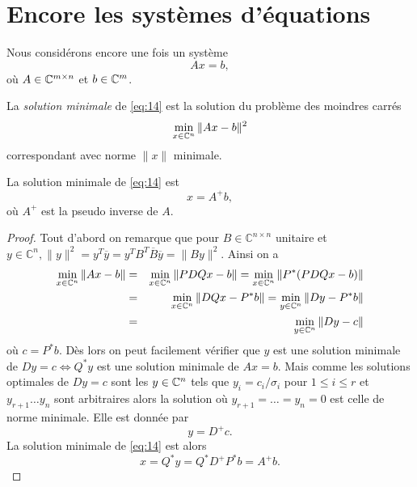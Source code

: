 \section{Encore les systèmes d'équations }
\label{sec:encore-les-systemes}
Nous considérons encore une fois un système 
\begin{equation}
  \label{eq:14}
  Ax = b, 
\end{equation}
où $A \in \mathbb{C}^{m \times n}$ et $b \in \mathbb{C}^m$. 

\begin{definition}
  \label{def:25}
  La \emph{solution minimale} de \eqref{eq:14} est 
  la solution du problème des moindres carrés
  \begin{displaymath}
    \min_{x \in \mathbb{C}^n} \|Ax - b\|^2 
  \end{displaymath}
    correspondant avec norme $\|x\|$ minimale.
\end{definition}



\begin{theorem}
  \label{thr:24}
  La solution minimale de \eqref{eq:14} est 
  \begin{displaymath}
    x = A^+ b,
  \end{displaymath}
où $A^+$ est la pseudo inverse de $A$. 
\end{theorem}

\begin{proof}
Tout d'abord on remarque que pour $B\in \mathbb{C}^{n \times n}$ unitaire et $ y\in \mathbb{C}^n, \|y\|^2=y^T\overline {y}=y^TB^T\overline { B}\overline { y }=\|By\|^2$. Ainsi on a 
  \begin{eqnarray*}
    \min_{x \in \mathbb{C}^n} \|Ax - b\| & = &      \min_{x \in \mathbb{C}^n} \|PDQx - b\| =     \min_{x \in \mathbb{C}^n} \|P^* (PDQx - b)\|        \\
     & = &     \min_{x \in \mathbb{C}^n} \|DQx - P^*b\| =     \min_{y \in \mathbb{C}^n} \|Dy - P^*b \| \\
      & = &       \min_{y \in \mathbb{C}^n} \|Dy - c \|
  \end{eqnarray*}
où $c  = P^*b$. Dès lors on peut facilement vérifier que $y$ est une solution minimale de $Dy=c \Leftrightarrow  Q^*y$ est une solution minimale de $Ax=b$. Mais comme les solutions optimales de $Dy=c$  sont les $y \in \mathbb{C}^n$ tels que $y_i = c_i / \sigma_i $ pour $1 \leq i \leq r$ et $y_{r+1} \dots y_n$ sont arbitraires alors la solution où $y_{r+1} =\dots= y_n=0$ est celle de norme minimale. Elle est donnée par
\begin{displaymath}
  y = D^+ c. 
\end{displaymath}
La solution minimale de \eqref{eq:14} est alors 
\begin{displaymath}
  x = Q^*y = Q^* D^+ P^* b = A^+b. 
\end{displaymath}
\end{proof}


